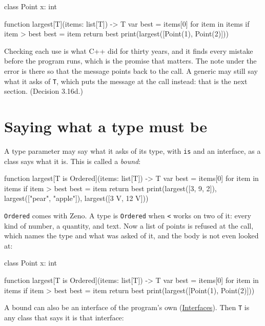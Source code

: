 \begin{zeno}[fails=yes]
class Point {
    x: int
}

function largest[T](items: list[T]) -> T {
    var best = items[0]
    for item in items {
        if item > best {
            best = item
        }
    }
    return best
}
print(largest([Point(1), Point(2)]))
\end{zeno}

\begin{why}
Checking each use is what C++ did for thirty years, and it finds every
mistake before the program runs, which is the promise that matters.
The note under the error is there so that the message points back to
the call. A generic may still say what it asks of \verb|T|, which
puts the message at the call instead: that is the next section.
(Decision 3.16d.)
\end{why}

\section{Saying what a type must be}

A type parameter may say what it asks of its type, with \verb|is| and
an interface, as a class says what it is. This is called a
\emph{bound}:

\begin{zeno}[file=largest.zeno, dir=bounds]
function largest[T is Ordered](items: list[T]) -> T {
    var best = items[0]
    for item in items {
        if item > best {
            best = item
        }
    }
    return best
}
print(largest([3, 9, 2]), largest(["pear", "apple"]), largest([3 V, 12 V]))
\end{zeno}

\verb|Ordered| comes with Zeno. A type is \verb|Ordered| when
\verb|<| works on two of it: every kind of number, a quantity, and
text. Now a list of points is refused at the call, which names the
type and what was asked of it, and the body is not even looked at:

\begin{zeno}[fails=yes]
class Point {
    x: int
}

function largest[T is Ordered](items: list[T]) -> T {
    var best = items[0]
    for item in items {
        if item > best {
            best = item
        }
    }
    return best
}
print(largest([Point(1), Point(2)]))
\end{zeno}

A bound can also be an interface of the program's own
(\hyperref[ch-interfaces]{Interfaces}). Then \verb|T| is any class
that says it is that interface:

